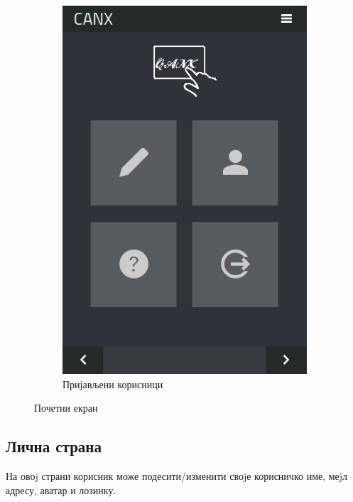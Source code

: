 \documentclass[a4paper]{article}
\begin{document}
\begin{figure}
\begin{subfigure}{.5\textwidth}
  \includegraphics[width=.9\linewidth]{home_auth}
  \caption{Пријављени корисници}
  \label{fig:sub2}
\end{subfigure}
\caption{Почетни екран}
\label{fig:test}
\end{figure}

\subsection{Лична страна}
\label{personal}
На овоj страни корисник може подесити/изменити своjе корисничко име,
меjл адресу, аватар и лозинку.
\end{document}
